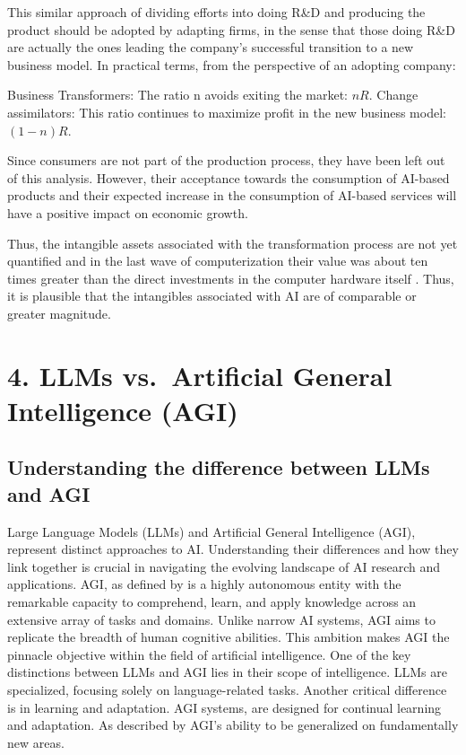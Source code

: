 \documentclass[preprint, 3p,
authoryear]{elsarticle} %
\begin{document}
This similar approach of dividing efforts into doing R\&D and producing
the product should be adopted by adapting firms, in the sense that those
doing R\&D are actually the ones leading the company's successful
transition to a new business model. In practical terms, from the
perspective of an adopting company:

Business Transformers: The ratio n avoids exiting the market: \(nR\).
Change assimilators: This ratio continues to maximize profit in the new
business model: \((1-n)R\).

Since consumers are not part of the production process, they have been
left out of this analysis. However, their acceptance towards the
consumption of AI-based products and their expected increase in the
consumption of AI-based services will have a positive impact on economic
growth.

Thus, the intangible assets associated with the transformation process
are not yet quantified and in the last wave of computerization their
value was about ten times greater than the direct investments in the
computer hardware itself \citep{paradox}. Thus, it is plausible that the
intangibles associated with AI are of comparable or greater magnitude.

\hypertarget{llms-vs.-artificial-general-intelligence-agi}{%
\section{4. LLMs vs.~Artificial General Intelligence
(AGI)}\label{llms-vs.-artificial-general-intelligence-agi}}

\hypertarget{understanding-the-difference-between-llms-and-agi}{%
\subsection{Understanding the difference between LLMs and
AGI}\label{understanding-the-difference-between-llms-and-agi}}

Large Language Models (LLMs) and Artificial General Intelligence (AGI),
represent distinct approaches to AI. Understanding their differences and
how they link together is crucial in navigating the evolving landscape
of AI research and applications. AGI, as defined by
\citep{Zhou2023PathTM} is a highly autonomous entity with the remarkable
capacity to comprehend, learn, and apply knowledge across an extensive
array of tasks and domains. Unlike narrow AI systems, AGI aims to
replicate the breadth of human cognitive abilities. This ambition makes
AGI the pinnacle objective within the field of artificial intelligence.
One of the key distinctions between LLMs and AGI lies in their scope of
intelligence. LLMs are specialized, focusing solely on language-related
tasks. Another critical difference is in learning and adaptation. AGI
systems, are designed for continual learning and adaptation. As
described by \citep{Wang2012Chapter1I} AGI's ability to be generalized
on fundamentally new areas.
\end{document}
